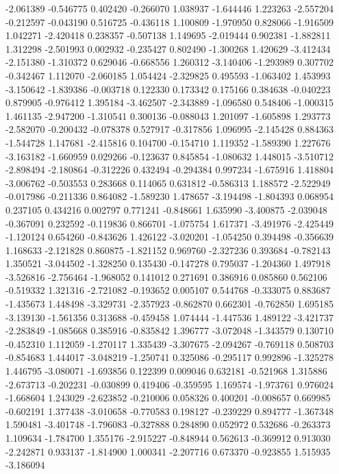 -2.061389
-0.546775
0.402420
-0.266070
1.038937
-1.644446
1.223263
-2.557204
-0.212597
-0.043190
0.516725
-0.436118
1.100809
-1.970950
0.828066
-1.916509
1.042271
-2.420418
0.238357
-0.507138
1.149695
-2.019444
0.902381
-1.882811
1.312298
-2.501993
0.002932
-0.235427
0.802490
-1.300268
1.420629
-3.412434
-2.151380
-1.310372
0.629046
-0.668556
1.260312
-3.140406
-1.293989
0.307702
-0.342467
1.112070
-2.060185
1.054424
-2.329825
0.495593
-1.063402
1.453993
-3.150642
-1.839386
-0.003718
0.122330
0.173342
0.175166
0.384638
-0.040223
0.879905
-0.976412
1.395184
-3.462507
-2.343889
-1.096580
0.548406
-1.000315
1.461135
-2.947200
-1.310541
0.300136
-0.088043
1.201097
-1.605898
1.293773
-2.582070
-0.200432
-0.078378
0.527917
-0.317856
1.096995
-2.145428
0.884363
-1.544728
1.147681
-2.415816
0.104700
-0.154710
1.119352
-1.589390
1.227676
-3.163182
-1.660959
0.029266
-0.123637
0.845854
-1.080632
1.448015
-3.510712
-2.898494
-2.180864
-0.312226
0.432494
-0.294384
0.997234
-1.675916
1.418804
-3.006762
-0.503553
0.283668
0.114065
0.631812
-0.586313
1.188572
-2.522949
-0.017986
-0.211336
0.864082
-1.589230
1.478657
-3.194498
-1.804393
0.068954
0.237105
0.434216
0.002797
0.771241
-0.848661
1.635990
-3.400875
-2.039048
-0.367091
0.232592
-0.119836
0.866701
-1.075754
1.617371
-3.491976
-2.425449
-1.120124
0.654260
-0.843626
1.426122
-3.020201
-1.054250
0.394498
-0.356639
1.168633
-2.121828
0.860875
-1.821152
0.969760
-2.327236
0.393684
-0.782143
1.350521
-3.044502
-1.328250
0.135430
-0.147278
0.795037
-1.204360
1.497918
-3.526816
-2.756464
-1.968052
0.141012
0.271691
0.386916
0.085860
0.562106
-0.519332
1.321316
-2.721082
-0.193652
0.005107
0.544768
-0.333075
0.883687
-1.435673
1.448498
-3.329731
-2.357923
-0.862870
0.662301
-0.762850
1.695185
-3.139130
-1.561356
0.313688
-0.459458
1.074444
-1.447536
1.489122
-3.421737
-2.283849
-1.085668
0.385916
-0.835842
1.396777
-3.072048
-1.343579
0.130710
-0.452310
1.112059
-1.270117
1.335439
-3.307675
-2.094267
-0.769118
0.508703
-0.854683
1.444017
-3.048219
-1.250741
0.325086
-0.295117
0.992896
-1.325278
1.446795
-3.080071
-1.693856
0.122399
0.009046
0.632181
-0.521968
1.315886
-2.673713
-0.202231
-0.030899
0.419406
-0.359595
1.169574
-1.973761
0.976024
-1.668604
1.243029
-2.623852
-0.210006
0.058326
0.400201
-0.008657
0.669985
-0.602191
1.377438
-3.010658
-0.770583
0.198127
-0.239229
0.894777
-1.367348
1.590481
-3.401748
-1.796083
-0.327888
0.284890
0.052972
0.532686
-0.263373
1.109634
-1.784700
1.355176
-2.915227
-0.848944
0.562613
-0.369912
0.913030
-2.242871
0.933137
-1.814900
1.000341
-2.207716
0.673370
-0.923855
1.515935
-3.186094
